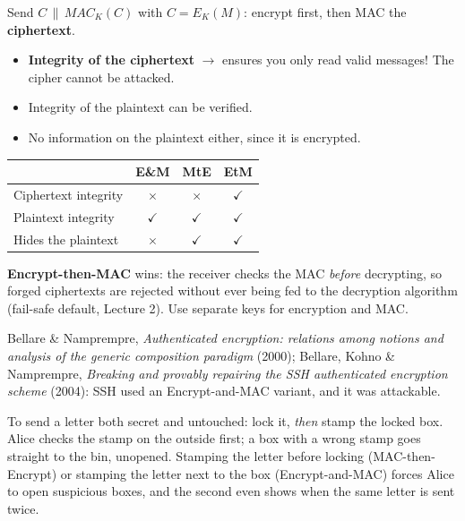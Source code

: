\begin{defnbox}[title=Encrypt-then-MAC]
Send $C \,\|\, MAC_K(C)$ with $C = E_K(M)$: encrypt first, then MAC the
\textbf{ciphertext}.
\begin{itemize}
  \item[$\checkmark$] \textbf{Integrity of the ciphertext} $\to$ ensures you only read
        valid messages! The cipher cannot be attacked.
  \item[$\checkmark$] Integrity of the plaintext can be verified.
  \item[$\checkmark$] No information on the plaintext either, since it is encrypted.
\end{itemize}
\end{defnbox}

\begin{keybox}[title=Which composition to use?]
\begin{center}
\begin{tabular}{l|c|c|c}
                     & \textbf{E\&M} & \textbf{MtE} & \textbf{EtM} \\ \hline
Ciphertext integrity & $\times$      & $\times$     & $\checkmark$ \\
Plaintext integrity  & $\checkmark$  & $\checkmark$ & $\checkmark$ \\
Hides the plaintext  & $\times$      & $\checkmark$ & $\checkmark$
\end{tabular}
\end{center}
\textbf{Encrypt-then-MAC} wins: the receiver checks the MAC \emph{before} decrypting, so
forged ciphertexts are rejected without ever being fed to the decryption algorithm
(fail-safe default, Lecture 2). Use separate keys for encryption and MAC.
\end{keybox}

\begin{rembox}[title=Further reading]
Bellare \& Namprempre, \emph{Authenticated encryption: relations among notions and analysis of
the generic composition paradigm} (2000); Bellare, Kohno \& Namprempre, \emph{Breaking and
provably repairing the SSH authenticated encryption scheme} (2004): SSH used an
Encrypt-and-MAC variant, and it was attackable.
\end{rembox}

\begin{goatbox}
To send a letter both secret and untouched: lock it, \emph{then} stamp the locked box. Alice
checks the stamp on the outside first; a box with a wrong stamp goes straight to the bin,
unopened. Stamping the letter before locking (MAC-then-Encrypt) or stamping the letter next to the
box (Encrypt-and-MAC) forces Alice to open suspicious boxes, and the second even shows when the
same letter is sent twice.
\end{goatbox}

